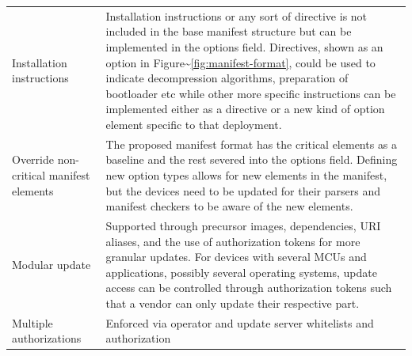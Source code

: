 \documentclass[0-thesis.tex]{subfiles}
\begin{document}
\begin{longtable}[]{@{}ll@{}}
    \begin{minipage}[t]{0.41\columnwidth}\raggedright\strut
    Installation instructions\strut
    \end{minipage} & \begin{minipage}[t]{0.53\columnwidth}\raggedright\strut
    Installation instructions or any sort of directive is not included in
    the base manifest structure but can be implemented in the options field.
    Directives, shown as an option in
    Figure\textasciitilde{}\ref{fig:manifest-format}, could be used to
    indicate decompression algorithms, preparation of bootloader etc while
    other more specific instructions can be implemented either as a
    directive or a new kind of option element specific to that
    deployment.\strut
    \end{minipage}\tabularnewline
    \begin{minipage}[t]{0.41\columnwidth}\raggedright\strut
    Override non-critical manifest elements\strut
    \end{minipage} & \begin{minipage}[t]{0.53\columnwidth}\raggedright\strut
    The proposed manifest format has the critical elements as a baseline and
    the rest severed into the options field. Defining new option types
    allows for new elements in the manifest, but the devices need to be
    updated for their parsers and manifest checkers to be aware of the new
    elements.\strut
    \end{minipage}\tabularnewline
    \begin{minipage}[t]{0.41\columnwidth}\raggedright\strut
    Modular update\strut
    \end{minipage} & \begin{minipage}[t]{0.53\columnwidth}\raggedright\strut
    Supported through precursor images, dependencies, URI aliases, and the
    use of authorization tokens for more granular updates. For devices with
    several MCUs and applications, possibly several operating systems,
    update access can be controlled through authorization tokens such that a
    vendor can only update their respective part.\strut
    \end{minipage}\tabularnewline
    \begin{minipage}[t]{0.41\columnwidth}\raggedright\strut
    Multiple authorizations\strut
    \end{minipage} & \begin{minipage}[t]{0.53\columnwidth}\raggedright\strut
    Enforced via operator and update server whitelists and authorization

\end{minipage}
\end{longtable}
\end{document}
